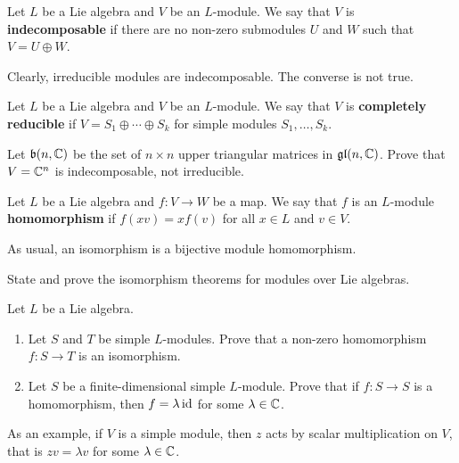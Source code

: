 \begin{definition}
    Let $L$ be a Lie algebra and $V$ be an $L$-module. We say 
    that $V$ is \textbf{indecomposable} if 
    there are no non-zero submodules $U$ and $W$ such that
    $V=U\oplus W$.
\end{definition}

Clearly, irreducible modules are indecomposable. 
The converse is not true.

\begin{definition}
    Let $L$ be a Lie algebra and $V$ be an $L$-module. We say that
    $V$ is \textbf{completely reducible} if $V=S_1\oplus\cdots\oplus S_k$
    for simple modules $S_1,\dots,S_k$. 
\end{definition}

\begin{exercise}
    Let $\mathfrak{b}(n,\mathbb{C})$ be the set of $n\times n$ 
    upper triangular 
    matrices in $\mathfrak{gl}(n,\mathbb{C})$. Prove that $V=\mathbb{C}^n$ is indecomposable,  
    not irreducible. 
\end{exercise}

\begin{definition}
    Let $L$ be a Lie algebra and $f\colon V\to W$ be a map. 
    We say that $f$ is an $L$-module \textbf{homomorphism} if
    $f(xv)=xf(v)$ for all $x\in L$ and $v\in V$. 
\end{definition}

As usual, an isomorphism is a bijective module homomorphism. 

\begin{exercise}
    State and prove the isomorphism theorems for modules
    over Lie algebras. 
\end{exercise}

\begin{exercise}
    Let $L$ be a Lie algebra.
    \begin{enumerate}
        \item Let $S$ and $T$ be simple $L$-modules.
            Prove that a non-zero homomorphism $f\colon S\to T$ 
            is an isomorphism.
        \item Let $S$ be a finite-dimensional simple $L$-module. 
            Prove that if $f\colon S\to S$ is a homomorphism, then
                $f=\lambda\operatorname{id}$ for some $\lambda\in\mathbb{C}$. 
    \end{enumerate} 
\end{exercise}

As an example, if $V$ is a simple module, then $z$
acts by scalar multiplication on $V$, that is
$zv=\lambda v$ for some $\lambda\in\mathbb{C}$. 


